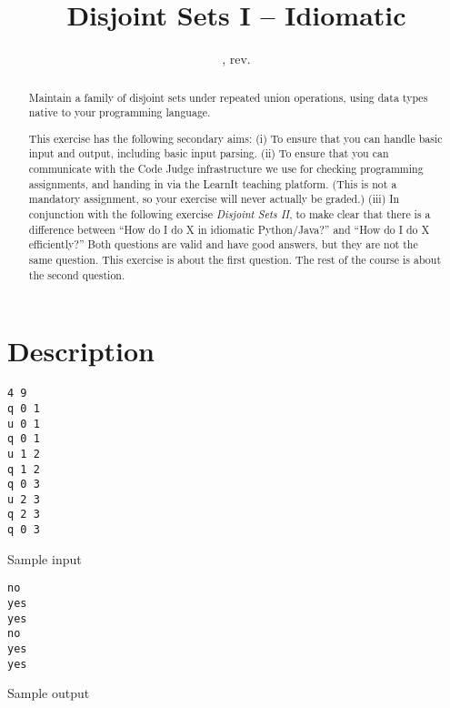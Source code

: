 \documentclass{tufte-handout}
\title{Disjoint Sets I -- Idiomatic}
\author{}
\date{\GITAuthorDate, rev. \GITAbrHash}
\begin{document}
\maketitle

\begin{abstract}
  Maintain a family of disjoint sets under repeated union operations, using data types native to your programming language.

  This exercise has the following secondary aims:
  (i) To ensure that you can handle basic input and output, including basic input parsing.
  (ii) To ensure that you can communicate with the Code Judge infrastructure we use for checking programming assignments, and handing in via the LearnIt teaching platform.
  (This is not a mandatory assignment, so your exercise will never actually be graded.)
  (iii) In conjunction with the following exercise \emph{Disjoint Sets II}, to make clear that there is a difference between ``How do I do X in idiomatic Python/Java?'' and ``How do I do X efficiently?''
  Both questions are valid and have good answers, but they are not the same question.
  This exercise is about the first question.
  The rest of the course is about the second question.
\end{abstract}

\section{Description}

\begin{marginfigure}
\begin{verbatim} 
4 9
q 0 1
u 0 1
q 0 1
u 1 2
q 1 2
q 0 3
u 2 3
q 2 3
q 0 3
\end{verbatim} 
  \caption{Sample input}
\end{marginfigure}

\begin{marginfigure}
  \begin{verbatim}
no
yes
yes
no
yes
yes
  \end{verbatim}
  \caption{Sample output}
\end{marginfigure}
\end{document}
